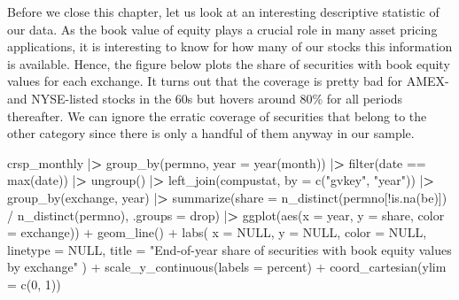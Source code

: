 \documentclass[
]{book}
\newenvironment{Shaded}{\begin{snugshade}}{\end{snugshade}}
\newcommand{\AttributeTok}[1]{\textcolor[rgb]{0.61,0.61,0.61}{#1}}
\newcommand{\ConstantTok}[1]{\textcolor[rgb]{0,0,0}{#1}}
\newcommand{\DecValTok}[1]{\textcolor[rgb]{0.06,0.06,0.06}{#1}}
\newcommand{\ErrorTok}[1]{\textcolor[rgb]{0.14,0.14,0.14}{\textbf{#1}}}
\newcommand{\FunctionTok}[1]{\textcolor[rgb]{0,0,0}{#1}}
\newcommand{\NormalTok}[1]{#1}
\newcommand{\SpecialCharTok}[1]{\textcolor[rgb]{0,0,0}{#1}}
\newcommand{\StringTok}[1]{\textcolor[rgb]{0.5,0.5,0.5}{#1}}
\begin{document}
Before we close this chapter, let us look at an interesting descriptive statistic of our data. As the book value of equity plays a crucial role in many asset pricing applications, it is interesting to know for how many of our stocks this information is available. Hence, the figure below plots the share of securities with book equity values for each exchange. It turns out that the coverage is pretty bad for AMEX- and NYSE-listed stocks in the 60s but hovers around 80\% for all periods thereafter. We can ignore the erratic coverage of securities that belong to the other category since there is only a handful of them anyway in our sample.

\begin{Shaded}
\begin{Highlighting}[]
\NormalTok{crsp\_monthly }\SpecialCharTok{|}\ErrorTok{\textgreater{}}
  \FunctionTok{group\_by}\NormalTok{(permno, }\AttributeTok{year =} \FunctionTok{year}\NormalTok{(month)) }\SpecialCharTok{|}\ErrorTok{\textgreater{}}
  \FunctionTok{filter}\NormalTok{(date }\SpecialCharTok{==} \FunctionTok{max}\NormalTok{(date)) }\SpecialCharTok{|}\ErrorTok{\textgreater{}}
  \FunctionTok{ungroup}\NormalTok{() }\SpecialCharTok{|}\ErrorTok{\textgreater{}}
  \FunctionTok{left\_join}\NormalTok{(compustat, }\AttributeTok{by =} \FunctionTok{c}\NormalTok{(}\StringTok{"gvkey"}\NormalTok{, }\StringTok{"year"}\NormalTok{)) }\SpecialCharTok{|}\ErrorTok{\textgreater{}}
  \FunctionTok{group\_by}\NormalTok{(exchange, year) }\SpecialCharTok{|}\ErrorTok{\textgreater{}}
  \FunctionTok{summarize}\NormalTok{(}\AttributeTok{share =} \FunctionTok{n\_distinct}\NormalTok{(permno[}\SpecialCharTok{!}\FunctionTok{is.na}\NormalTok{(be)]) }\SpecialCharTok{/} \FunctionTok{n\_distinct}\NormalTok{(permno),}
            \AttributeTok{.groups =} \StringTok{\textquotesingle{}drop\textquotesingle{}}\NormalTok{) }\SpecialCharTok{|}\ErrorTok{\textgreater{}}
  \FunctionTok{ggplot}\NormalTok{(}\FunctionTok{aes}\NormalTok{(}\AttributeTok{x =}\NormalTok{ year, }\AttributeTok{y =}\NormalTok{ share, }\AttributeTok{color =}\NormalTok{ exchange)) }\SpecialCharTok{+}
  \FunctionTok{geom\_line}\NormalTok{() }\SpecialCharTok{+}
  \FunctionTok{labs}\NormalTok{(}
    \AttributeTok{x =} \ConstantTok{NULL}\NormalTok{, }\AttributeTok{y =} \ConstantTok{NULL}\NormalTok{, }\AttributeTok{color =} \ConstantTok{NULL}\NormalTok{, }\AttributeTok{linetype =} \ConstantTok{NULL}\NormalTok{,}
    \AttributeTok{title =} \StringTok{"End{-}of{-}year share of securities with book equity values by exchange"}
\NormalTok{  ) }\SpecialCharTok{+}
  \FunctionTok{scale\_y\_continuous}\NormalTok{(}\AttributeTok{labels =}\NormalTok{ percent) }\SpecialCharTok{+} 
  \FunctionTok{coord\_cartesian}\NormalTok{(}\AttributeTok{ylim =} \FunctionTok{c}\NormalTok{(}\DecValTok{0}\NormalTok{, }\DecValTok{1}\NormalTok{))}
\end{Highlighting}
\end{Shaded}
\end{document}
